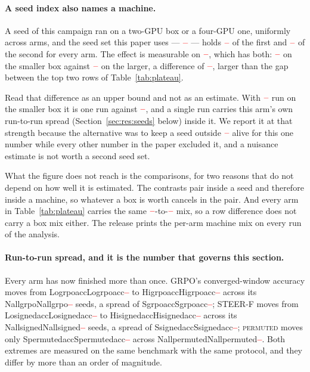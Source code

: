 \documentclass[11pt]{article}
\providecommand{\PENDING}{\textcolor{red}{\textbf{--}}}
\newcommand{\num}[1]{\ifcsname #1\endcsname\csname #1\endcsname\else\PENDING\fi}
\begin{document}
\paragraph{A seed index also names a machine.} A seed of this campaign ran on a
two-GPU box or a four-GPU one, uniformly across arms, and the seed set this paper
uses --- $\num{Seedset}$ --- holds $\num{Boxnlo}$ of the first and $\num{Boxnhi}$ of
the second for every arm. The effect is measurable on $\num{Boxarm}$, which has both:
$\num{Boxlo}$ on the smaller box against $\num{Boxhi}$ on the larger, a difference of
$\num{Boxdelta}$, larger than the gap between the top two rows of
Table~\ref{tab:plateau}.

Read that difference as an upper bound and not as an estimate. With
$\num{Boxnlo}$ run on the smaller box it is one run against $\num{Boxnhi}$, and a
single run carries this arm's own run-to-run spread (Section~\ref{sec:res:seeds}
below) inside it. We report it at that strength because the alternative was to keep a
seed outside $\num{Seedset}$ alive for this one number while every other number in
the paper excluded it, and a nuisance estimate is not worth a second seed set.

What the figure does not reach is the comparisons, for two reasons that do not depend
on how well it is estimated. The contrasts pair inside a seed and therefore inside a
machine, so whatever a box is worth cancels in the pair. And every arm in
Table~\ref{tab:plateau} carries the same $\num{Boxnlo}$-to-$\num{Boxnhi}$ mix, so a
row difference does not carry a box mix either. The release prints the per-arm machine
mix on every run of the analysis.

\paragraph{Run-to-run spread, and it is the number that governs this section.}
Every arm has now finished more than once. GRPO's converged-window accuracy moves
from \num{Logrpoacc} to \num{Higrpoacc} across its \num{Nallgrpo} seeds, a spread
of \num{Sgrpoacc}; STEER-F moves from \num{Losignedacc} to \num{Hisignedacc} across
its \num{Nallsigned} seeds, a spread of \num{Ssignedacc}; \textsc{permuted}
moves only \num{Spermutedacc} across \num{Nallpermuted}. Both extremes are
measured on the same benchmark with the same protocol, and they differ by more than
an order of magnitude.
\end{document}
